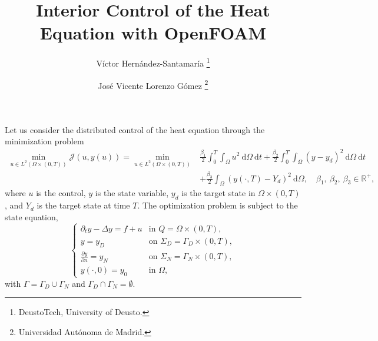 \documentclass[12pt,a4paper]{article}
\newcommand{\dom}{\ \mathrm{d} \Omega}
\newcommand{\dt}{\ \mathrm{d} t}
\theoremstyle{plain}
\theoremstyle{definition}
\begin{document}
\title{Interior Control of the Heat Equation with OpenFOAM}
\author{Víctor Hernández-Santamaría \thanks{DeustoTech, University of Deusto.} \and José Vicente Lorenzo Gómez \thanks{Universidad Autónoma de Madrid.} }

\maketitle


Let us consider the distributed control of the heat equation through the minimization problem
%
\begin{equation}
\begin{split}
\min_{u \in L^2 \left( \Omega \times \left( 0 , T \right) \right)} \mathcal{J} \left( u , y \left( u \right) \right) = \min_{u \in L^2 \left( \Omega \times \left( 0 , T \right) \right)} & \frac{\beta_1}{2} \int_0^T \int_{\Omega} u^2 \dom \dt + \frac{\beta_2}{2}\int_0^T \int_{\Omega} \left( y - y_d \right)^2 \dom \dt \\ & + \frac{\beta_3}{2} \int_{\Omega} \left( y\left( \cdot, T \right) - Y_d \right)^2 \dom, \quad \beta_1, \ \beta_2, \ \beta_3 \in \mathbb{R}^+,
\end{split}
\end{equation}
%
where $u$ is the control, $y$ is the state variable, $y_d$ is the target state in $\Omega \times \left( 0, T \right)$, and $Y_d$ is the target state at time $T$. The optimization problem is subject to the state equation,
%
\begin{equation}
\begin{cases}
\partial_t y - \Delta y = f + u & \text{in } Q = \Omega \times \left( 0, T \right),\\
y = y_D & \text{on } \Sigma_D = \Gamma_D \times \left( 0, T \right),\\
\displaystyle \frac{\partial y}{\partial n} = y_N & \text{on } \Sigma_N = \Gamma_N \times \left( 0, T \right),\\
y \left( \cdot, 0 \right) = y_0 & \text{in } \Omega,
\end{cases}
\end{equation}
%
with $\Gamma = \Gamma_D \cup \Gamma_N$ and $\Gamma_D \cap \Gamma_N= \emptyset$.
\end{document}
